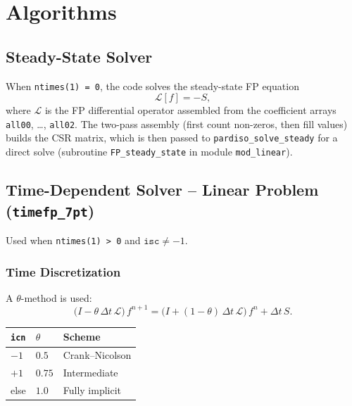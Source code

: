 \documentclass[11pt,a4paper]{article}
\newcommand{\dt}{\Delta t}
\newcommand{\Lcal}{\mathcal{L}}
\begin{document}
\section{Algorithms}

\subsection{Steady-State Solver}

When \texttt{ntimes(1) = 0}, the code solves the steady-state FP equation
\begin{equation}
  \Lcal[f] = -S,
\end{equation}
where $\Lcal$ is the FP differential operator assembled from the coefficient
arrays \texttt{all00}, \ldots, \texttt{all02}.  The two-pass assembly (first
count non-zeros, then fill values) builds the CSR matrix, which is then
passed to \texttt{pardiso\_solve\_steady} for a direct solve (subroutine
\texttt{FP\_steady\_state} in module \texttt{mod\_linear}).

\subsection{Time-Dependent Solver -- Linear Problem (\texttt{timefp\_7pt})}

Used when \texttt{ntimes(1) > 0} and $\texttt{isc} \ne -1$.

\subsubsection{Time Discretization}

A $\theta$-method is used:
\begin{equation}
  \bigl(I - \theta\,\dt\,\Lcal\bigr)\,f^{n+1}
  = \bigl(I + (1-\theta)\,\dt\,\Lcal\bigr)\,f^n + \dt\,S.
\end{equation}

\begin{center}
\begin{tabular}{lll}
\toprule
\texttt{icn} & $\theta$ & Scheme \\
\midrule
$-1$  & $0.5$  & Crank--Nicolson \\
$+1$  & $0.75$ & Intermediate \\
else  & $1.0$  & Fully implicit \\
\bottomrule
\end{tabular}
\end{center}
\end{document}

